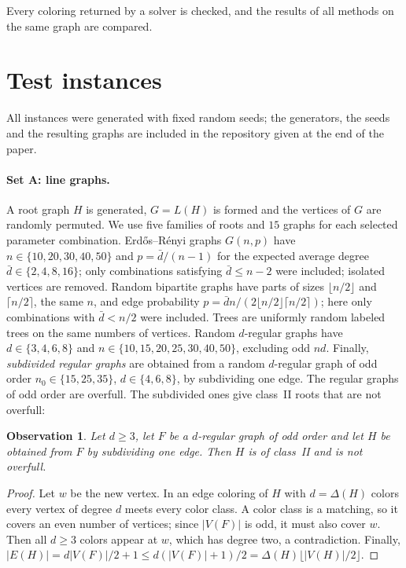 \documentclass[11pt,a4paper]{article}
\newtheorem{observation}[theorem]{Observation}
\begin{document}
Every coloring returned by a solver is checked, and the results of all methods
on the same graph are compared.

\section{Test instances}

All instances were generated with fixed random seeds; the generators, the
seeds and the resulting graphs are included in the repository given at the end
of the paper.

\paragraph{Set A: line graphs.}
A root graph $H$ is generated, $G=L(H)$ is formed and the vertices of $G$ are
randomly permuted. We use five families of roots and $15$ graphs for each
selected parameter combination. Erd\H{o}s--R\'enyi graphs $G(n,p)$ have
$n\in\{10,20,30,40,50\}$ and $p=\bar d/(n-1)$ for the expected average degree
$\bar d\in\{2,4,8,16\}$; only combinations satisfying $\bar d\le n-2$ were included;
isolated vertices are removed. Random bipartite graphs have parts of sizes
$\lfloor n/2\rfloor$ and $\lceil n/2\rceil$, the same $n$, and edge
probability $p=\bar d n/(2\lfloor n/2\rfloor\lceil n/2\rceil)$; here only
combinations with $\bar d<n/2$ were included. Trees are uniformly random labeled trees on the same numbers of
vertices. Random $d$-regular graphs \cite{steger1999} have $d\in\{3,4,6,8\}$ and
$n\in\{10,15,20,25,30,40,50\}$, excluding odd $nd$. Finally,
\emph{subdivided regular graphs} are obtained from a random $d$-regular graph
of odd order $n_0\in\{15,25,35\}$, $d\in\{4,6,8\}$, by subdividing one edge. The
regular graphs of odd order are overfull. The subdivided ones give class~II
roots that are not overfull:

\begin{observation}\label{obs:subdiv}
Let $d\ge 3$, let $F$ be a $d$-regular graph of odd order and let $H$ be
obtained from $F$ by subdividing one edge. Then $H$ is of class~II and is not
overfull.
\end{observation}
\begin{proof}
Let $w$ be the new vertex. In an edge coloring of $H$ with $d=\Delta(H)$
colors every vertex of degree $d$ meets every color class. A color class is a
matching, so it covers an even number of vertices; since $|V(F)|$ is odd, it
must also cover $w$. Then all $d\ge 3$ colors appear at $w$, which has degree
two, a contradiction. Finally,
$|E(H)|=d|V(F)|/2+1\le d(|V(F)|+1)/2=\Delta(H)\lfloor|V(H)|/2\rfloor$.
\end{proof}
\end{document}
